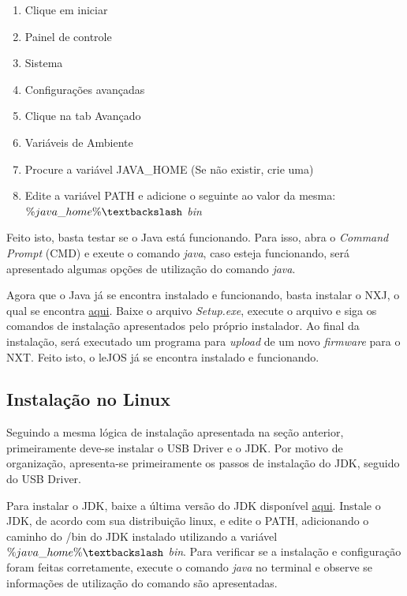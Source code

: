 	\begin{enumerate}
		\item Clique em iniciar
		\item Painel de controle
		\item Sistema
		\item Configurações avançadas
		\item Clique na tab Avançado
		\item Variáveis de Ambiente
		\item Procure a variável JAVA\_HOME (Se não existir, crie uma)
		\item Edite a variável PATH e adicione o seguinte ao valor da mesma: \textit{$\%java\_home\% \textbackslash$ bin}
	\end{enumerate}

	Feito isto, basta testar se o Java está funcionando. Para isso, abra o \textit{Command Prompt} (CMD) e exeute o comando \textit{java}, caso esteja funcionando, será apresentado algumas opções de utilização do comando \textit{java}.

	Agora que o Java já se encontra instalado e funcionando, basta instalar o NXJ, o qual se encontra \href{http://www.lejos.org/}{aqui}. Baixe o arquivo \textit{Setup.exe}, execute o arquivo e siga os comandos de instalação apresentados pelo próprio instalador. Ao final da instalação, será executado um programa para \textit{upload} de um novo \textit{firmware} para o NXT. Feito isto, o leJOS já se encontra instalado e funcionando.

\subsection{Instalação no Linux} %
\label{sub:instalação_no_linux}
	
	Seguindo a mesma lógica de instalação apresentada na seção anterior, primeiramente deve-se instalar o USB Driver e o JDK. Por motivo de organização, apresenta-se primeiramente os passos de instalação do JDK, seguido do USB Driver.

	Para instalar o JDK, baixe a última versão do JDK disponível \href{http://www.oracle.com/technetwork/java/}{aqui}. Instale o JDK, de acordo com sua distribuição linux, e edite o PATH, adicionando o caminho do /bin do JDK instalado utilizando a variável \textit{$\%java\_home\% \textbackslash$ bin}. Para verificar se a instalação e configuração foram feitas corretamente, execute o comando \textit{java} no terminal e observe se informações de utilização do comando são apresentadas.

